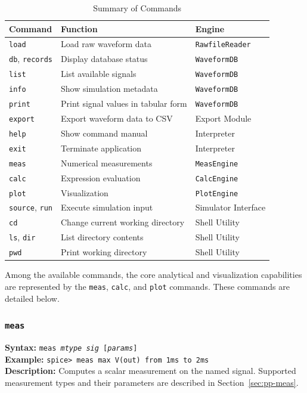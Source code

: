 \begin{table}[H]
\centering
\caption{Summary of Commands}
\label{tab:commands}
\begin{tabular}{lll}
\hline
\textbf{Command} & \textbf{Function} & \textbf{Engine} \\ \hline
\texttt{load} & Load raw waveform data & \texttt{RawfileReader} \\
\texttt{db}, \texttt{records} & Display database status & \texttt{WaveformDB} \\
\texttt{list} & List available signals & \texttt{WaveformDB} \\
\texttt{info} & Show simulation metadata & \texttt{WaveformDB} \\
\texttt{print} & Print signal values in tabular form & \texttt{WaveformDB} \\
\texttt{export} & Export waveform data to CSV & Export Module \\
\texttt{help} & Show command manual & Interpreter \\
\texttt{exit} & Terminate application & Interpreter \\
\texttt{meas} & Numerical measurements & \texttt{MeasEngine} \\
\texttt{calc} & Expression evaluation & \texttt{CalcEngine} \\
\texttt{plot} & Visualization & \texttt{PlotEngine} \\
\texttt{source}, \texttt{run} & Execute simulation input & Simulator Interface \\
\texttt{cd} & Change current working directory & Shell Utility \\
\texttt{ls}, \texttt{dir} & List directory contents & Shell Utility \\
\texttt{pwd} & Print working directory & Shell Utility \\
\hline
\end{tabular}
\end{table}

Among the available commands, the core analytical and visualization capabilities are represented by the \texttt{meas}, \texttt{calc}, and \texttt{plot} commands. These commands are detailed below.

\subsubsection{\texttt{meas}}
\textbf{Syntax:} \texttt{meas \textit{mtype} \textit{sig} [\textit{params}]}\\
\textbf{Example:} \texttt{spice> meas max V(out) from 1ms to 2ms}\\
\textbf{Description:} Computes a scalar measurement on the named signal. Supported measurement types and their parameters are described in Section~\ref{sec:pp-meas}.


